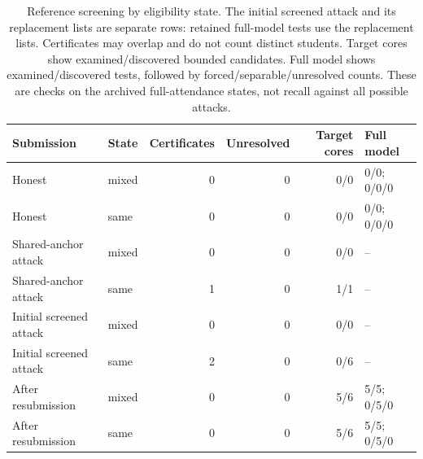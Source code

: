 \begin{table}[tb]\centering\small
\caption{Reference screening by eligibility state. The initial screened attack and its replacement lists are separate rows: retained full-model tests use the replacement lists. Certificates may overlap and do not count distinct students. Target cores show examined/discovered bounded candidates. Full model shows examined/discovered tests, followed by forced/separable/unresolved counts. These are checks on the archived full-attendance states, not recall against all possible attacks.}\label{tab:screen}
\begin{tabular}{@{}llrrrl@{}}\toprule
Submission & State & Certificates & Unresolved & Target cores & Full model \\ \midrule
Honest & mixed & 0 & 0 & 0/0 & 0/0; 0/0/0 \\
Honest & same & 0 & 0 & 0/0 & 0/0; 0/0/0 \\
Shared-anchor attack & mixed & 0 & 0 & 0/0 & -- \\
Shared-anchor attack & same & 1 & 0 & 1/1 & -- \\
Initial screened attack & mixed & 0 & 0 & 0/0 & -- \\
Initial screened attack & same & 2 & 0 & 0/6 & -- \\
After resubmission & mixed & 0 & 0 & 5/6 & 5/5; 0/5/0 \\
After resubmission & same & 0 & 0 & 5/6 & 5/5; 0/5/0 \\
\bottomrule\end{tabular}\end{table}
